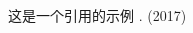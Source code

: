 
\fontsize{10.5pt}{10.5pt}\selectfont
\begin{thebibliography}{10}

这是一个引用的示例
.
\newblock (2017)


\end{thebibliography}
